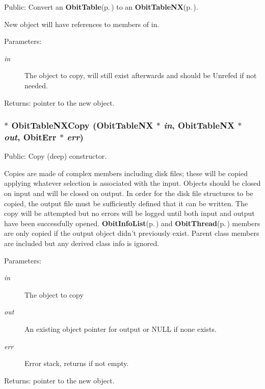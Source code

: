 Public: Convert an {\bf Obit\-Table}{\rm (p.\,\pageref{structObitTable})} to an {\bf Obit\-Table\-NX}{\rm (p.\,\pageref{structObitTableNX})}. 

New object will have references to members of in. \begin{Desc}
\item[Parameters:]
\begin{description}
\item[{\em in}]The object to copy, will still exist afterwards and should be Unrefed if not needed. \end{description}
\end{Desc}
\begin{Desc}
\item[Returns:]pointer to the new object. \end{Desc}
\subsubsection{$\ast$ Obit\-Table\-NXCopy ({\bf Obit\-Table\-NX} $\ast$ {\em in}, {\bf Obit\-Table\-NX} $\ast$ {\em out}, {\bf Obit\-Err} $\ast$ {\em err})}\label{ObitTableNX_8h_a14}


Public: Copy (deep) constructor. 

Copies are made of complex members including disk files; these will be copied applying whatever selection is associated with the input. Objects should be closed on input and will be closed on output. In order for the disk file structures to be copied, the output file must be sufficiently defined that it can be written. The copy will be attempted but no errors will be logged until both input and output have been successfully opened. {\bf Obit\-Info\-List}{\rm (p.\,\pageref{structObitInfoList})} and {\bf Obit\-Thread}{\rm (p.\,\pageref{structObitThread})} members are only copied if the output object didn't previously exist. Parent class members are included but any derived class info is ignored. \begin{Desc}
\item[Parameters:]
\begin{description}
\item[{\em in}]The object to copy \item[{\em out}]An existing object pointer for output or NULL if none exists. \item[{\em err}]Error stack, returns if not empty. \end{description}
\end{Desc}
\begin{Desc}
\item[Returns:]pointer to the new object. \end{Desc}
